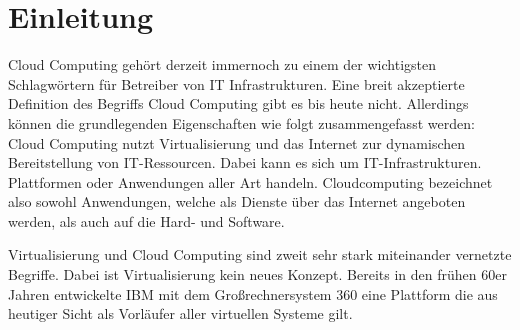 \chapter{Einleitung}
\label{sec:einleitung}

Cloud Computing gehört derzeit immernoch zu einem der wichtigsten Schlagwörtern für Betreiber von IT Infrastrukturen.
\glqq Eine breit akzeptierte Definition des Begriffs Cloud Computing gibt es bis heute nicht. Allerdings können die grundlegenden Eigenschaften wie folgt zusammengefasst werden: Cloud Computing nutzt Virtualisierung und das Internet zur dynamischen Bereitstellung von IT-Ressourcen. Dabei kann es sich um IT-Infrastrukturen. Plattformen oder Anwendungen aller Art handeln. Cloudcomputing bezeichnet also sowohl Anwendungen, welche als Dienste über das Internet angeboten werden, als auch auf die Hard- und Software.\grqq \cite[S. 28]{meinel_virtualisierung_2011}

Virtualisierung und Cloud Computing sind zweit sehr stark miteinander vernetzte Begriffe.
Dabei ist Virtualisierung kein neues Konzept. Bereits in den frühen 60er Jahren entwickelte IBM mit dem Großrechnersystem 360 eine Plattform die aus heutiger Sicht als Vorläufer aller virtuellen Systeme gilt. \cite{frank_balmes_grin_????}

